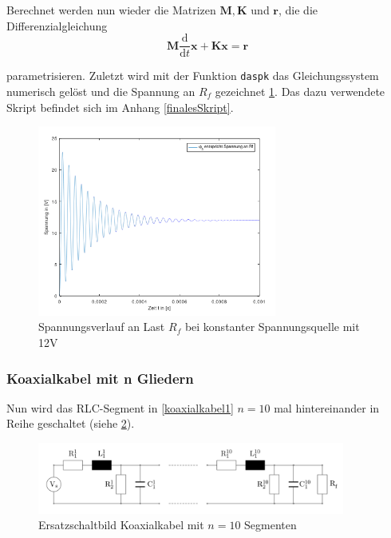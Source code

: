 \newpage
Berechnet werden nun wieder die Matrizen $\mathbf{M, K}$ und $\mathbf{r}$, die die Differenzialgleichung
\begin{equation}
\mathbf{M} \frac{\text{d}}{\text{d}t} \mathbf{x} + \mathbf{K} \mathbf{x} = \mathbf{r}
\label{matrixDGL}
\end{equation}

parametrisieren. Zuletzt wird mit der Funktion \texttt{daspk} das Gleichungssystem numerisch gelöst und die Spannung an $R_f$ gezeichnet \ref{plottKK1}. Das dazu verwendete Skript befindet sich im Anhang \ref{finalesSkript}.

\begin{figure}[h]
	\centering
	\includegraphics[width=0.7\textwidth]{data/plotKK1}
	\caption{Spannungsverlauf an Last $R_f$ bei konstanter Spannungsquelle mit 12\si{\volt}}
	\label{plottKK1}
\end{figure}

\subsubsection{Koaxialkabel mit n Gliedern}
Nun wird das RLC-Segment in \ref{koaxialkabel1} $n=10$ mal hintereinander in Reihe geschaltet (siehe \ref{koaxialkabel10}).

\begin{figure}[h]
	\centering
	\includegraphics[width= 0.9\textwidth]{data/Koaxialkabel10}
	\caption{Ersatzschaltbild Koaxialkabel mit $n=10$ Segmenten}
	\label{koaxialkabel10}
\end{figure}

